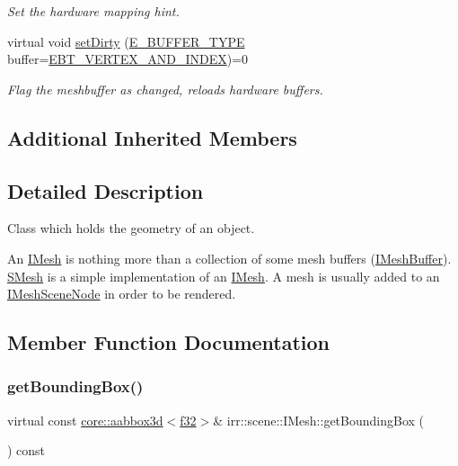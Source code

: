 \begin{DoxyCompactItemize}
\begin{DoxyCompactList}\small\item\em Set the hardware mapping hint. \end{DoxyCompactList}\item 
virtual void \hyperlink{classirr_1_1scene_1_1IMesh_a496534cd4813d520d887785720f66c9b}{set\+Dirty} (\hyperlink{namespaceirr_1_1scene_a8f59a89ffef0ad8e5b2c2cb874a93e8c}{E\+\_\+\+B\+U\+F\+F\+E\+R\+\_\+\+T\+Y\+PE} buffer=\hyperlink{namespaceirr_1_1scene_a8f59a89ffef0ad8e5b2c2cb874a93e8ca34ea664123fbc28610408e51b014dcdd}{E\+B\+T\+\_\+\+V\+E\+R\+T\+E\+X\+\_\+\+A\+N\+D\+\_\+\+I\+N\+D\+EX})=0
\begin{DoxyCompactList}\small\item\em Flag the meshbuffer as changed, reloads hardware buffers. \end{DoxyCompactList}\end{DoxyCompactItemize}
\subsection*{Additional Inherited Members}


\subsection{Detailed Description}
Class which holds the geometry of an object. 

An \hyperlink{classirr_1_1scene_1_1IMesh}{I\+Mesh} is nothing more than a collection of some mesh buffers (\hyperlink{classirr_1_1scene_1_1IMeshBuffer}{I\+Mesh\+Buffer}). \hyperlink{structirr_1_1scene_1_1SMesh}{S\+Mesh} is a simple implementation of an \hyperlink{classirr_1_1scene_1_1IMesh}{I\+Mesh}. A mesh is usually added to an \hyperlink{classirr_1_1scene_1_1IMeshSceneNode}{I\+Mesh\+Scene\+Node} in order to be rendered. 

\subsection{Member Function Documentation}
\mbox{\label{classirr_1_1scene_1_1IMesh_ada6ecee9cbebed8bb67fd92872552ea0}} 
\subsubsection{\texorpdfstring{get\+Bounding\+Box()}{getBoundingBox()}\hspace{0.1cm}{\footnotesize\ttfamily [1/2]}}
{\footnotesize\ttfamily virtual const \hyperlink{classirr_1_1core_1_1aabbox3d}{core\+::aabbox3d}$<$\hyperlink{namespaceirr_a0277be98d67dc26ff93b1a6a1d086b07}{f32}$>$\& irr\+::scene\+::\+I\+Mesh\+::get\+Bounding\+Box (\begin{DoxyParamCaption}{ }\end{DoxyParamCaption}) const\hspace{0.3cm}{\ttfamily [pure virtual]}}



